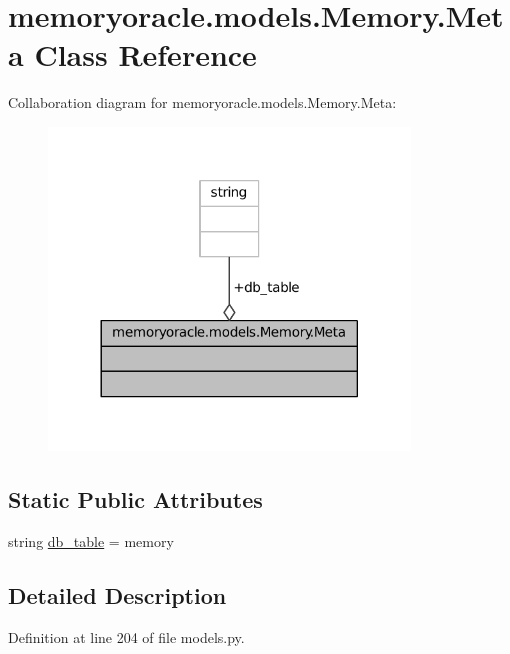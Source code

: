 \hypertarget{classmemoryoracle_1_1models_1_1Memory_1_1Meta}{}\section{memoryoracle.\+models.\+Memory.\+Meta Class Reference}
\label{classmemoryoracle_1_1models_1_1Memory_1_1Meta}


Collaboration diagram for memoryoracle.\+models.\+Memory.\+Meta\+:\nopagebreak
\begin{figure}[H]
\begin{center}
\leavevmode
\includegraphics[width=272pt]{classmemoryoracle_1_1models_1_1Memory_1_1Meta__coll__graph}
\end{center}
\end{figure}
\subsection*{Static Public Attributes}
\begin{DoxyCompactItemize}
\item 
string \hyperlink{classmemoryoracle_1_1models_1_1Memory_1_1Meta_a4a165802fdb1a8e2643aba9d59e91cf4}{db\+\_\+table} = \textquotesingle{}memory\textquotesingle{}
\end{DoxyCompactItemize}


\subsection{Detailed Description}


Definition at line 204 of file models.\+py.



